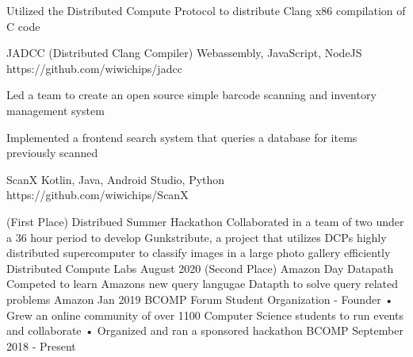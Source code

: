 \documentclass[]{awesome-cv}
\begin{document}
\vspace{-7mm}
\begin{cventries}
	\cventry
  {\begin{cvitems}
  	\item{Utilized the Distributed Compute Protocol to distribute Clang x86 compilation of C code}
  \end{cvitems}}
	{JADCC (Distributed Clang Compiler)}
	{Webassembly, JavaScript, NodeJS}
	{https://github.com/wiwichips/jadcc}
	{}
	
	\vspace{-5mm}
	\cventry
  {\begin{cvitems}
    \item{Led a team to create an open source simple barcode scanning and inventory management system}
    \item{Implemented a frontend search system that queries a database for items previously scanned}
  \end{cvitems}}
	{ScanX}
	{Kotlin, Java, Android Studio, Python}
	{https://github.com/wiwichips/ScanX}
	{}

	\vspace{-5mm}
\end{cventries}
\begin{cvhonors}
	\cvhonor
	{(First Place) Distribued Summer Hackathon}
	{Collaborated in a team of two under a 36 hour period to develop Gunkstribute, a project that utilizes DCP\textquotesingle{}s highly distributed supercomputer to classify images in a large photo gallery efficiently}
	{Distributed Compute Labs}
	{August 2020}
	\cvhonor
	{(Second Place) Amazon Day Datapath}
	{Competed to learn Amazon\textquotesingle{}s new query langugae Datapth to solve query related problems}
	{Amazon}
	{Jan 2019}
	\cvhonor
	{BCOMP Forum Student Organization - Founder}
	{• Grew an online community of over 1100 Computer Science students to run events and collaborate • Organized and ran a sponsored hackathon}
	{BCOMP}
	{September 2018 - Present}
\end{cvhonors}
\ 
\end{document}
